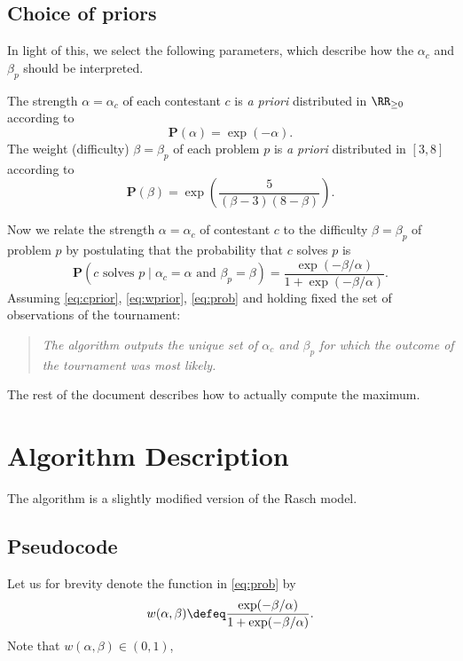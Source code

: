 \subsection{Choice of priors}
In light of this, we select the following parameters,
which describe how the $\alpha_c$ and $\beta_p$ should be interpreted.
\begin{itemize}
	\ii The strength $\alpha = \alpha_c$ of each contestant
	$c$ is \emph{a priori} distributed in $\RR_{\ge 0}$
	according to
	\begin{equation}
		\mathbf P(\alpha) = \exp(-\alpha).
		\label{eq:cprior}
	\end{equation}
	\ii The weight (difficulty) $\beta = \beta_p$ of each problem $p$ is
	\emph{a priori} distributed in $[3,8]$ according to 
	\begin{equation}
		\mathbf P(\beta) = \exp\left( \frac{5}{(\beta-3)(8-\beta)} \right).
		\label{eq:wprior}
	\end{equation}
\end{itemize}
Now we relate the strength $\alpha = \alpha_c$ of contestant $c$
to the difficulty $\beta = \beta_p$ of problem $p$ by
postulating that the probability that $c$ solves $p$ is
\begin{equation}
	\mathbf P
	\left( \text{$c$ solves $p$} 
	\mid \alpha_c = \alpha \text{ and } \beta_p = \beta \right)
	= \frac{\exp(-\beta/\alpha)}{1 + \exp(-\beta/\alpha)}.
	\label{eq:prob}
\end{equation}
Assuming \eqref{eq:cprior}, \eqref{eq:wprior}, \eqref{eq:prob}
and holding fixed the set of observations of the tournament:
\begin{quote}
\itshape
The algorithm outputs the unique set of $\alpha_c$ and $\beta_p$
for which the outcome of the tournament was most likely.
\end{quote}
The rest of the document describes how to actually compute
the maximum.

\section{Algorithm Description}
The algorithm is a slightly modified version of the Rasch model.

\subsection{Pseudocode}
Let us for brevity denote the function in \eqref{eq:prob} by 
\[ w(\alpha, \beta) \defeq \frac{\exp(-\beta/\alpha)}{1 + \exp(-\beta/\alpha)}. \]
Note that $w(\alpha, \beta) \in (0,1)$,

